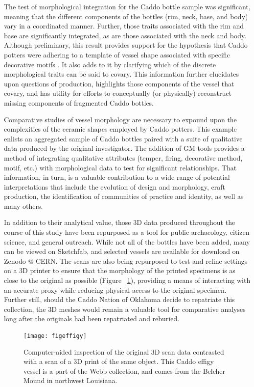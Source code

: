 \documentclass[review]{elsarticle}
\begin{document}
The test of morphological integration for the Caddo bottle sample was significant, meaning that the different components of the bottles (rim, neck, base, and body) vary in a coordinated manner. Further, those traits associated with the rim and base are significantly integrated, as are those associated with the neck and body. Although preliminary, this result provides support for the hypothesis that Caddo potters were adhering to a template of vessel shape associated with specific decorative motifs \citep{RN1660}. It also adds to it by clarifying which of the discrete morphological traits can be said to covary. This information further elucidates upon questions of production, highlights those components of the vessel that covary, and has utility for efforts to conceptually (or physically) reconstruct missing components of fragmented Caddo bottles. 

Comparative studies of vessel morphology are necessary to expound upon the complexities of the ceramic shapes employed by Caddo potters. This example enlists an aggregated sample of Caddo bottles paired with a suite of qualitative data produced by the original investigator. The addition of GM tools provides a method of integrating qualitative attributes (temper, firing, decorative method, motif, etc.) with morphological data to test for significant relationships. That information, in turn, is a valuable contribution to a wide range of potential interpretations that include the evolution of design and morphology, craft production, the identification of communities of practice and identity, as well as many others.

In addition to their analytical value, those 3D data produced throughout the course of this study have been repurposed as a tool for public archaeology, citizen science, and general outreach. While not all of the bottles have been added, many can be viewed on Sketchfab, and selected vessels are available for download on Zenodo @ CERN. The scans are also being repurposed to test and refine settings on a 3D printer to ensure that the morphology of the printed specimens is as close to the original as possible (Figure ~\ref{fig:FigEffigy}), providing a means of interacting with an accurate proxy while reducing physical access to the original specimen. Further still, should the Caddo Nation of Oklahoma decide to repatriate this collection, the 3D meshes would remain a valuable tool for comparative analyses long after the originals had been repatriated and reburied. 

\begin{figure}[ht]\centering
\texttt{[image: figeffigy]}
\caption{Computer-aided inspection of the original 3D scan data contrasted with a scan of a 3D print of the same object. This Caddo effigy vessel is a part of the Webb collection, and comes from the Belcher Mound in northwest Louisiana.}
\label{fig:FigEffigy}
\end{figure}
\end{document}

